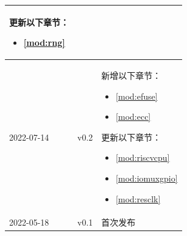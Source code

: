 \begin{longtable}[l]{ | m{2cm} | m{1.5cm} | m{12cm} | }
\begin{itemize}
            \end{itemize}
        更新以下章节：
            \begin{itemize}
                \item \ref{mod:rng} \textit{\nameref{mod:rng}}
            \end{itemize}
 \\\hline
    2022-07-14 & v0.2 &
        新增以下章节：
            \begin{itemize}
                \item \ref{mod:efuse} \textit{\nameref{mod:efuse}}
                \item \ref{mod:ecc} \textit{\nameref{mod:ecc}}
            \end{itemize}
        更新以下章节：
            \begin{itemize}
                \item \ref{mod:riscvcpu} \textit{\nameref{mod:riscvcpu}}
                \item \ref{mod:iomuxgpio} \textit{\nameref{mod:iomuxgpio}}
                \item \ref{mod:resclk} \textit{\nameref{mod:resclk}}
            \end{itemize}
 \\\hline
    2022-05-18 & v0.1 & 首次发布\\\hline
\end{longtable}

